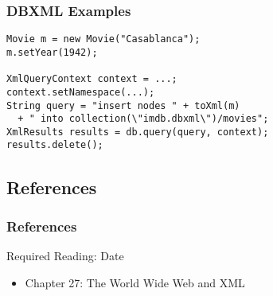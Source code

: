 \documentclass[dvipsnames]{beamer}
\theoremstyle{plain}
\begin{document}
\begin{frame}[fragile]
  \frametitle{DBXML Examples}

  \begin{example}[insert]
    \begin{lstlisting}
Movie m = new Movie("Casablanca");
m.setYear(1942);

XmlQueryContext context = ...;
context.setNamespace(...);
String query = "insert nodes " + toXml(m)
  + " into collection(\"imdb.dbxml\")/movies";
XmlResults results = db.query(query, context);
results.delete();
    \end{lstlisting}
  \end{example}
\end{frame}

\subsection*{References}

\begin{frame}
  \frametitle{References}

  \begin{block}{Required Reading: Date}
    \begin{itemize}
      \item Chapter 27: \alert{The World Wide Web and XML}
    \end{itemize}
  \end{block}
\end{frame}
\end{document}
